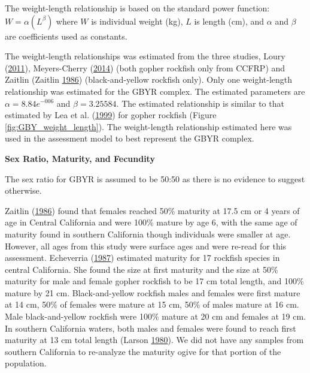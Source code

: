 \documentclass[12pt,]{article}
\begin{document}
The weight-length relationship is based on the standard power function:
\(W = \alpha(L^\beta)\) where \(W\) is individual weight (kg), \(L\) is
length (cm), and \(\alpha\) and \(\beta\) are coefficients used as
constants.

The weight-length relationships was estimated from the three studies,
Loury (\protect\hyperlink{ref-Loury2011}{2011}), Meyers-Cherry
(\protect\hyperlink{ref-MeyersCherry2014}{2014}) (both gopher rockfish
only from CCFRP) and Zaitlin (Zaitlin
\protect\hyperlink{ref-Zaitlin1986}{1986}) (black-and-yellow rockfish
only). Only one weight-length relationship was estimated for the GBYR
complex. The estimated parameters are \(\alpha = 8.84e^{-006}\) and
\(\beta = 3.25584\). The estimated relationship is similar to that
estimated by Lea et al. (\protect\hyperlink{ref-Lea1999}{1999}) for
gopher rockfish (Figure \ref{fig:GBY_weight_length}). The weight-length
relationship estimated here was used in the assessment model to best
represent the GBYR complex.

\vspace{.5cm} \textbf{Sex Ratio, Maturity, and Fecundity}

The sex ratio for GBYR is assumed to be 50:50 as there is no evidence to
suggest otherwise.

Zaitlin (\protect\hyperlink{ref-Zaitlin1986}{1986}) found that females
reached 50\% maturity at 17.5 cm or 4 years of age in Central California
and were 100\% mature by age 6, with the same age of maturity found in
southern California though individuals were smaller at age. However, all
ages from this study were surface ages and were re-read for this
assessment. Echeverria (\protect\hyperlink{ref-Echeverria1987}{1987})
estimated maturity for 17 rockfish species in central California. She
found the size at first maturity and the size at 50\% maturity for male
and female gopher rockfish to be 17 cm total length, and 100\% mature by
21 cm. Black-and-yellow rockfish males and females were first mature at
14 cm, 50\% of females were mature at 15 cm, 50\% of males mature at 16
cm. Male black-and-yellow rockfish were 100\% mature at 20 cm and
females at 19 cm. In southern California waters, both males and females
were found to reach first maturity at 13 cm total length (Larson
\protect\hyperlink{ref-Larson1980}{1980}). We did not have any samples
from southern California to re-analyze the maturity ogive for that
portion of the population.
\end{document}
